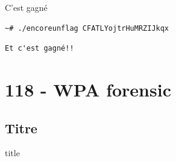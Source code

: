 \documentclass[10pt,sans,usenames,dvipsnames,french,compress]{beamer}
\begin{document}
\begin{frame}[fragile]{C'est gagné}
	\begin{block}{}
		\vspace{-3mm}
		\begin{lstlisting}[style=Term]
			~# ./encoreunflag CFATLYojtrHuMRZIJkqx
		\end{lstlisting}
		\vspace{-2mm}
	\end{block}

	\begin{block}{}
		\vspace{-3mm}
		\begin{lstlisting}[style=Term]
			Et c'est gagné!!
		\end{lstlisting}
		\vspace{-2mm}
	\end{block}
\end{frame}

\section{118 - WPA forensic}
\subsection{Titre}
\begin{frame}
	\begin{beamercolorbox}[sep=8pt,center]{title}
	\end{beamercolorbox}
\end{frame}
\end{document}
